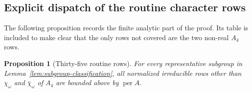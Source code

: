 \documentclass[11pt]{article}
\newtheorem{proposition}[theorem]{Proposition}
\theoremstyle{definition}
\newcommand{\per}{\operatorname{per}}
\begin{document}
\subsection{Explicit dispatch of the routine character rows}

The following proposition records the finite analytic part of the proof.
Its table is included to make clear that the only rows not covered are the
two non-real $A_4$ rows.

\begin{proposition}[Thirty-five routine rows]\label{prop:routine-rows}
For every representative subgroup in Lemma~\ref{lem:subgroup-classification},
all normalized irreducible rows other than $\chi_\omega$ and
$\bar\chi_\omega$ of $A_4$ are bounded above by $\per A$.
\end{proposition}
\end{document}
